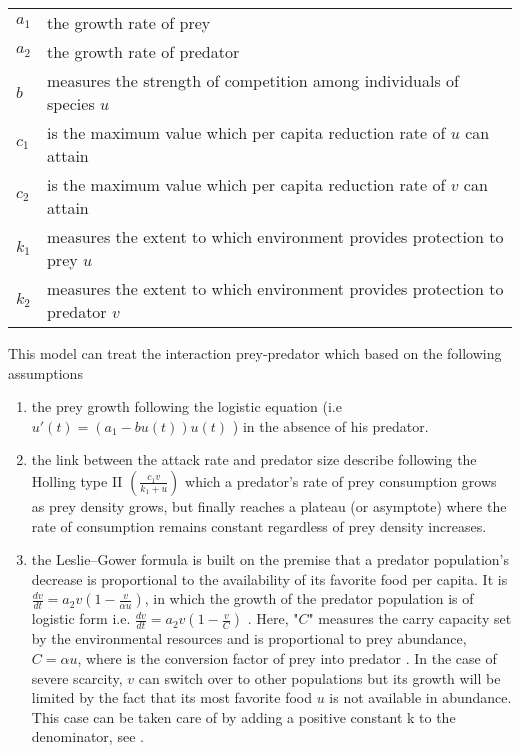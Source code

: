 \documentclass[[a4paper,10pt]{article}
\begin{document}
\begin{table}[hbtp]
\begin{center}
\begin{tabular}{p{0.7cm}p{12.7cm}}

$a_1$&the growth rate of prey\\
$a_2$&the growth rate of predator\\
$b$&measures the strength of competition among individuals of species $u$\\
$c_1$&is the maximum value which per capita reduction rate of $u$ can attain\\
$c_2$&is the maximum value which per capita reduction rate of $v$ can attain\\
$k_1$&measures the extent to which environment provides protection to prey $u$\\
$k_2$&measures the extent to which environment provides protection to predator $v$
\end{tabular}
\end{center}
\end{table}
This model can treat the interaction prey-predator which based on the following assumptions
\begin{enumerate}
\item the prey growth following the logistic equation (i.e $u'(t)=(a_1 -bu(t))u(t)$ ) in the absence of his predator.
\item the link between the attack rate and predator size describe following the Holling type II $\left(\frac{c_1v}{k_1+u}\right)$ which a predator's rate of prey consumption grows as prey density grows, but finally reaches a plateau (or asymptote) where the rate of consumption remains constant regardless of prey density increases.
\item the Leslie–Gower formula is built on the premise that a predator population's decrease is proportional to the availability of its favorite food per capita. It is $\frac{dv}{dt}=a_2v\left(1-\frac{v}{\alpha u}\right)$, in which the growth of the predator population is of logistic form i.e. $\frac{dv}{dt}=a_2v\left(1-\frac{v}{C}\right)$
.
Here, "$C$" measures the carry capacity set by the environmental resources and is proportional to prey abundance, $C=\alpha u$, 
where is the conversion factor of prey into predator \cite{leslie1948some,leslie1960properties,steinmuller1978pielou}.
In the case of severe scarcity, $v$ can switch over to other populations but its growth will be limited
by the fact that its most favorite food $u$ is not available in abundance. This case can be taken care of by adding a
positive constant k to the denominator, see \cite{ aziz2002study,aziz2003boundedness}.
\end{enumerate}
\end{document}
